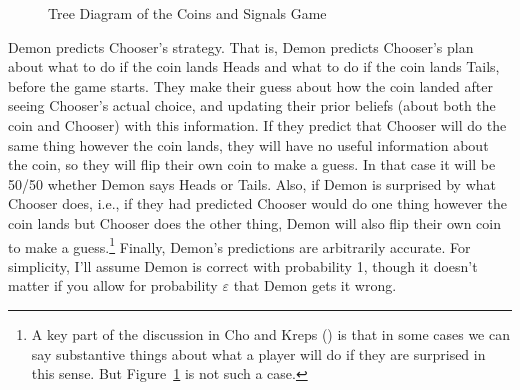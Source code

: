 \documentclass[
  12pt,
  letterpaper,
  DIV=11,
  numbers=noendperiod]{scrreprt}
\begin{document}
\begin{figure}


\caption{\label{fig-second-anti-war}Tree Diagram of the Coins and
Signals Game}

\end{figure}%

Demon predicts Chooser's strategy. That is, Demon predicts Chooser's
plan about what to do if the coin lands Heads and what to do if the coin
lands Tails, before the game starts. They make their guess about how the
coin landed after seeing Chooser's actual choice, and updating their
prior beliefs (about both the coin and Chooser) with this information.
If they predict that Chooser will do the same thing however the coin
lands, they will have no useful information about the coin, so they will
flip their own coin to make a guess. In that case it will be 50/50
whether Demon says Heads or Tails. Also, if Demon is surprised by what
Chooser does, i.e., if they had predicted Chooser would do one thing
however the coin lands but Chooser does the other thing, Demon will also
flip their own coin to make a guess.\footnote{A key part of the
  discussion in Cho and Kreps () is
  that in some cases we can say substantive things about what a player
  will do if they are surprised in this sense. But
  Figure~\ref{fig-second-anti-war} is not such a case.} Finally, Demon's
predictions are arbitrarily accurate. For simplicity, I'll assume Demon
is correct with probability 1, though it doesn't matter if you allow for
probability \(\varepsilon\) that Demon gets it wrong.
\end{document}
